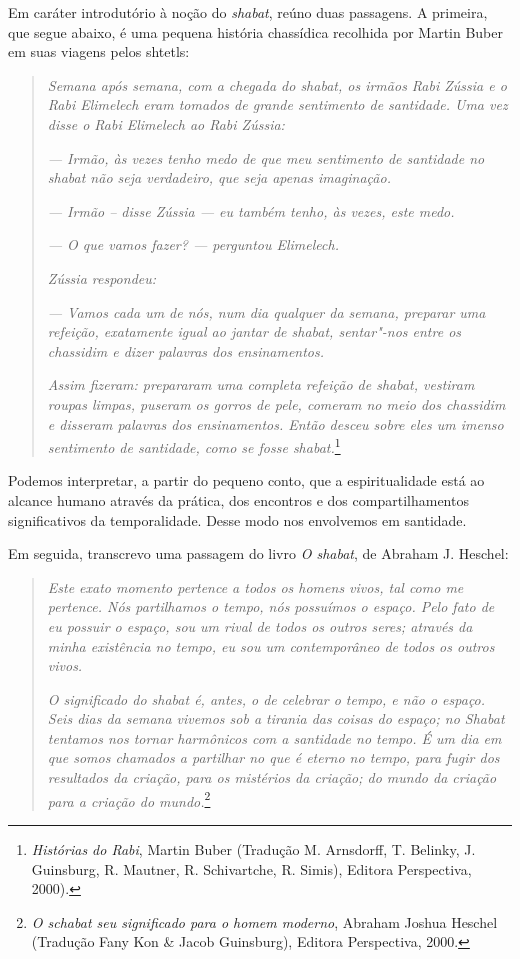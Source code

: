 Em caráter introdutório à noção do \emph{shabat}, reúno duas passagens. A
primeira, que segue abaixo, é uma pequena história chassídica recolhida
por Martin Buber em suas viagens pelos shtetls:

\begin{quote}
\emph{Semana após semana, com a chegada do shabat, os irmãos Rabi Zússia
e o Rabi Elimelech eram tomados de grande sentimento de santidade. Uma
vez disse o Rabi Elimelech ao Rabi Zússia:}

\emph{--- Irmão, às vezes tenho medo de que meu sentimento de santidade
no shabat não seja verdadeiro, que seja apenas imaginação.}

\emph{--- Irmão -- disse Zússia --- eu também tenho, às vezes, este medo.}

\emph{--- O que vamos fazer? --- perguntou Elimelech.}

\emph{Zússia respondeu:}

\emph{--- Vamos cada um de nós, num dia qualquer da semana, preparar uma
refeição, exatamente igual ao jantar de shabat, sentar"-nos entre os
chassidim e dizer palavras dos ensinamentos.}

\emph{Assim fizeram: prepararam uma completa refeição de shabat,
vestiram roupas limpas, puseram os gorros de pele, comeram no meio dos
chassidim e disseram palavras dos ensinamentos. Então desceu sobre eles
um imenso sentimento de santidade, como se fosse shabat.}\footnote{\emph{Histórias do Rabi}, Martin Buber (Tradução M. Arnsdorff, T. Belinky, J. Guinsburg, R. Mautner, R. Schivartche, R. Simis), Editora Perspectiva, 2000).}
\end{quote}

Podemos interpretar, a partir do pequeno conto, que a espiritualidade
está ao alcance humano através da prática, dos encontros e dos
compartilhamentos significativos da temporalidade. Desse modo nos
envolvemos em santidade.

Em seguida, transcrevo uma passagem do livro \emph{O shabat}, de Abraham
J. Heschel:

\begin{quote}
\emph{Este exato momento pertence a todos os homens vivos, tal como me
pertence. Nós partilhamos o tempo, nós possuímos o espaço. Pelo fato de
eu possuir o espaço, sou um rival de todos os outros seres; através da
minha existência no tempo, eu sou um contemporâneo de todos os outros
vivos.}

\emph{O significado do shabat é, antes, o de celebrar o tempo, e não o
espaço. Seis dias da semana vivemos sob a tirania das coisas do espaço;
no Shabat tentamos nos tornar harmônicos com a santidade no tempo. É um
dia em que somos chamados a partilhar no que é eterno no tempo, para
fugir dos resultados da criação, para os mistérios da criação; do mundo
da criação para a criação do mundo.}\footnote{\emph{O schabat seu significado para o homem moderno}, Abraham Joshua Heschel (Tradução Fany Kon \& Jacob Guinsburg), Editora Perspectiva, 2000.}
\end{quote}

